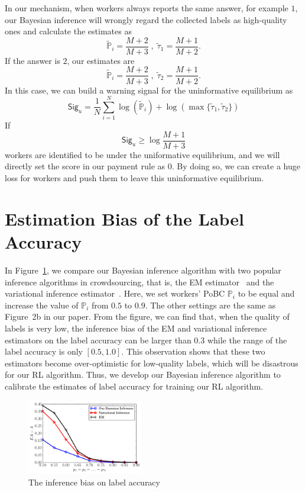 \documentclass{article}
\begin{document}
In our mechanism, when workers always reports the same answer, for example $1$, our Bayesian inference will 
wrongly regard the collected labels as high-quality ones and calculate the estimates as
\begin{equation}
\tilde{\mathbb{P}}_i=\frac{M+2}{M+3}\;,\;\tilde{\tau}_1=\frac{M+1}{M+2}.
\end{equation}
If the answer is $2$, our estimates are
\begin{equation}
\tilde{\mathbb{P}}_i=\frac{M+2}{M+3}\;,\;\tilde{\tau}_2=\frac{M+1}{M+2}.
\end{equation}
In this case, we can build a warning signal for the uninformative equilibrium as
\begin{equation}
\mathsf{Sig}_u = \frac{1}{N}\sum_{i=1}^{N}\log(\tilde{\mathbb{P}}_i)+\log(\max\{\tilde{\tau}_1,\tilde{\tau}_2 \})
\end{equation}
If
\begin{equation}
\mathsf{Sig}_u\geq \log\frac{M+1}{M+3}
\end{equation}
workers are identified to be under the uniformative equilibrium, and we will directly set the score in our payment rule as $0$.
By doing so, we can create a huge loss for workers and push them to leave this uninformative equilibrium.

\section{Estimation Bias of the Label Accuracy}
In Figure~\ref{BIM}, we compare our Bayesian inference algorithm with two popular inference algorithms in crowdsourcing, that is, the EM estimator~\cite{raykar2010learning} and the variational inference estimator~\cite{liu2012variational}.
Here, we set workers' PoBC $\mathbb{P}_i$ to be equal and increase the value of $\mathbb{P}_i$ from $0.5$ to $0.9$.
The other settings are the same as Figure~2b in our paper.
From the figure, we can find that, when the quality of labels is very low, the inference bias of the EM and variational inference estimators on the label accuracy can be larger than $0.3$ while the range of the label accuracy is only $[0.5,1.0]$.
This observation shows that these two estimators become over-optimistic for low-quality labels, which will be disastrous for our RL algorithm.
Thus, we develop our Bayesian inference algorithm to calibrate the estimates of label accuracy for training our RL algorithm.
\begin{figure}[!htb]
    \centering
    \includegraphics[width=0.45\textwidth]{image/EXPC1}
    \caption{\label{BIM}The inference bias on label accuracy}
\end{figure}
\end{document}
